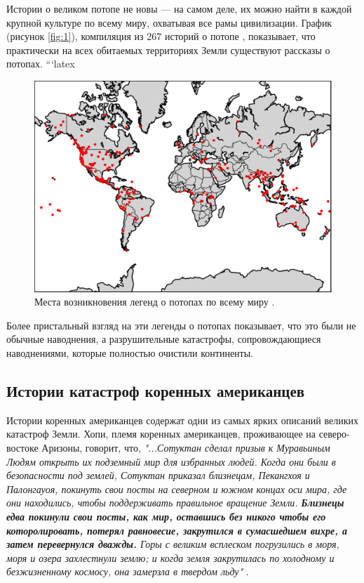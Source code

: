 \documentclass[10pt,twocolumn,letterpaper]{article}
\begin{document}
Истории о великом потопе не новы — на самом деле, их можно найти в каждой крупной культуре по всему миру, охватывая все рамы цивилизации. График (рисунок \ref{fig:1}), компиляция из 267 историй о потопе \cite{3}, показывает, что практически на всех обитаемых территориях Земли существуют рассказы о потопах.
```latex
\begin{figure}[h]
\begin{center}
   \includegraphics[width=1\linewidth]{b.png}
\end{center}
   \caption{Места возникновения легенд о потопах по всему миру \cite{3}.}
\label{fig:1}
\label{fig:onecol}
\end{figure}

Более пристальный взгляд на эти легенды о потопах показывает, что это были не обычные наводнения, а разрушительные катастрофы, сопровождающиеся наводнениями, которые полностью очистили континенты.

\subsection{Истории катастроф коренных американцев}

Истории коренных американцев содержат одни из самых ярких описаний великих катастроф Земли. Хопи, племя коренных американцев, проживающее на северо-востоке Аризоны, говорит, что, \textit{"...Сотуктан сделал призыв к Муравьиным Людям открыть их подземный мир для избранных людей. Когда они были в безопасности под землей, Сотуктан приказал близнецам, Пекангхоя и Палонгауоя, покинуть свои посты на северном и южном концах оси мира, где они находились, чтобы поддерживать правильное вращение Земли. \textbf{Близнецы едва покинули свои посты, как мир, оставшись без никого чтобы его которолировать, потерял равновесие, закрутился в сумасшедшем вихре, а затем перевернулся дважды.} Горы с великим всплеском погрузились в моря, моря и озера захлестнули землю; и когда земля закрутилась по холодному и безжизненному космосу, она замерзла в твердом льду"} \cite{4}.
\end{document}
